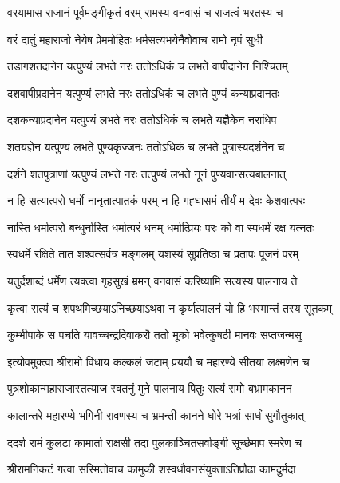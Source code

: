 \twolineshloka
{वरयामास राजानं पूर्वमङ्गीकृतं वरम्}
{रामस्य वनवासं च राजत्वं भरतस्य च}%


\twolineshloka
{वरं दातुं महाराजो नेयेष प्रेममोहितः}
{धर्मसत्यभयेनैवोवाच रामो नृपं सुधी}%


\twolineshloka
{तडागशतदानेन यत्पुण्यं लभते नरः}
{ततोऽधिकं च लभते वापीदानेन निश्चितम्}%


\twolineshloka
{दशवापीप्रदानेन यत्पुण्यं लभते नरः}
{ततोऽधिकं च लभते पुण्यं कन्याप्रदानतः}%


\twolineshloka
{दशकन्याप्रदानेन यत्पुण्यं लभते नरः}
{ततोऽधिकं च लभते यज्ञैकेन नराधिप}%


\twolineshloka
{शतयज्ञेन यत्पुण्यं लभते पुण्यकृज्जनः}
{ततोऽधिकं च लभते पुत्रास्यदर्शनेन च}%


\twolineshloka
{दर्शने शतपुत्राणां यत्पुण्यं लभते नरः}
{तत्पुण्यं लभते नूनं पुण्यवान्सत्यबालनात्}%


\twolineshloka
{न हि सत्यात्परो धर्मो नानृतात्पातकं परम्}
{न हि गह्घासमं तीर्यं म देवः केशवात्परः}%


\twolineshloka
{नास्ति धर्मात्परो बन्धुर्नास्ति धर्मात्परं धनम्}
{धर्मात्प्रियः परः को वा स्पधर्मं रक्ष यत्नतः}%


\twolineshloka
{स्वधर्मे रक्षिते तात शश्वत्सर्वत्र मङ्गलम्}
{यशस्यं सुप्रतिष्ठा च प्रतापः पूजनं परम्}%


\twolineshloka
{यतुर्दशाब्दं धर्मेण त्यक्त्वा गृहसुखं म्रमन्}
{वनवासं करिष्यामि सत्यस्य पालनाय ते}%


\twolineshloka
{कृत्वा सत्यं च शपथमिच्छयाऽनिच्छयाऽथवा}
{न कृर्यात्पालनं यो हि भस्मान्तं तस्य सूतकम्}%


\twolineshloka
{कुम्भीपाके स पचति यावच्चन्द्रदिवाकरौ}
{ततो मूको भवेत्कुषठी मानवः सप्तजन्मसु}%


\twolineshloka
{इत्योवमुक्त्वा श्रीरामो विधाय कल्कलं जटाम्}
{प्रययौ च महारण्ये सीतया लक्ष्मणेन च}%


\twolineshloka
{पुत्रशोकान्महाराजास्तत्याज स्वतनुं मुने}
{पालनाय पितुः सत्यं रामो बभ्रामकानन}%


\twolineshloka
{कालान्तरे महारण्ये भगिनी रावणस्य च}
{भ्रमन्ती कानने घोरे भर्त्रा सार्धं सुगौतुकात्}%


\twolineshloka
{ददर्श रामं कुलटा कामार्ता राक्षसी तदा}
{पुलकाञ्चितसर्वाङ्गी सूर्च्छमाप स्मरेण च}%


\twolineshloka
{श्रीरामनिकटं गत्वा सस्मितोवाच कामुकी}
{शस्वधौवनसंयुक्ताऽतिप्रौढा कामदुर्मदा}%

